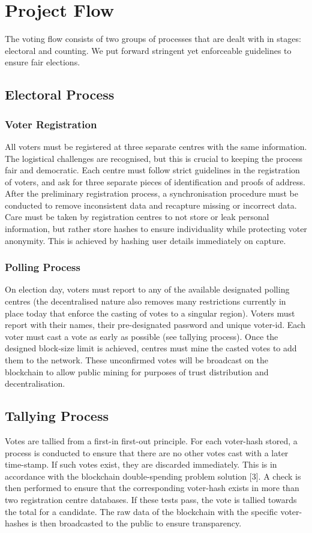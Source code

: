 \documentclass{article}
\begin{document}
    \section{Project Flow}
    The voting flow consists of two groups of processes that are dealt with in stages: electoral and counting. We put forward stringent yet enforceable guidelines to ensure fair elections.
    \subsection{Electoral Process}
    \subsubsection{Voter Registration}
    All voters must be registered at three separate centres with the same information. The logistical challenges are recognised, but this is crucial to keeping the process fair and democratic. Each centre must follow strict guidelines in the registration of voters, and ask for three separate pieces of identification and proofs of address. After the preliminary registration process, a synchronisation procedure must be conducted to remove inconsistent data and recapture missing or incorrect data. Care must be taken by registration centres to not store or leak personal information, but rather store hashes to ensure individuality while protecting voter anonymity. This is achieved by hashing user details immediately on capture.
    \subsubsection{Polling Process}
    On election day, voters must report to any of the available designated polling centres (the decentralised nature also removes many restrictions currently in place today that enforce the casting of votes to a singular region). Voters must report with their names, their pre-designated password and unique voter-id. Each voter must cast a vote as early as possible (see tallying process). Once the designed block-size limit is achieved, centres must mine the casted votes to add them to the network. These unconfirmed votes will be broadcast on the blockchain to allow public mining for purposes of trust distribution and decentralisation.
    \subsection{Tallying Process}
    Votes are tallied from a first-in first-out principle. For each voter-hash stored, a process is conducted to ensure that there are no other votes cast with a later time-stamp. If such votes exist, they are discarded immediately. This is in accordance with the blockchain double-spending problem solution [3]. A check is then performed to ensure that the corresponding voter-hash exists in more than two registration centre databases. If these tests pass, the vote is tallied towards the total for a candidate.
    The raw data of the blockchain with the specific voter-hashes is then broadcasted to the public to ensure transparency.
\end{document}
